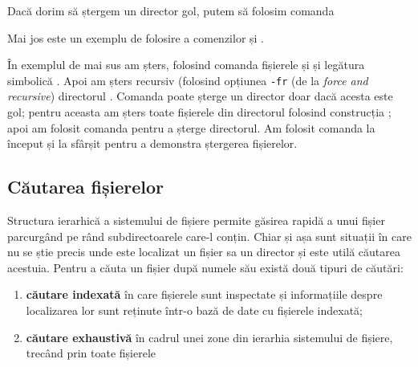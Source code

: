 \begin{note}[Observație]
Dacă dorim să ștergem un director gol, putem să folosim comanda
\end{note}

Mai jos este un exemplu de folosire a comenzilor  și .


În exemplul de mai sus am șters, folosind comanda  fișierele  și  și legătura simbolică . Apoi am șters recursiv (folosind opțiunea \texttt{-fr} (de la \textit{force and recursive}) directorul . Comanda  poate șterge un director doar dacă acesta este gol; pentru aceasta am șters toate fișierele din directorul  folosind construcția ; apoi am folosit comanda  pentru a șterge directorul. Am folosit comanda  la început și la sfârșit pentru a demonstra ștergerea fișierelor.

\subsection{Căutarea fișierelor}
\label{sec:file-system-file-search}

Structura ierarhică a sistemului de fișiere permite găsirea rapidă a unui fișier parcurgând pe rând subdirectoarele care-l conțin. Chiar și așa sunt situații în care nu se știe precis unde este localizat un fișier sa un director și este utilă căutarea acestuia. Pentru a căuta un fișier după numele său există două tipuri de căutări:
\begin{enumerate}
  \item \textbf{căutare indexată} în care fișierele sunt inspectate și informațiile despre localizarea lor sunt reținute într-o bază de date cu fișierele indexată;
  \item \textbf{căutare exhaustivă} în cadrul unei zone din ierarhia sistemului de fișiere, trecând prin toate fișierele
\end{enumerate}

